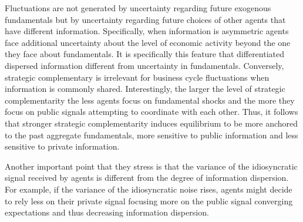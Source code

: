 \documentclass{article}
\begin{document}
{Fluctuations are not generated by uncertainty regarding future exogenous fundamentals but by uncertainty regarding future choices of other agents that have different information. Specifically, when information is asymmetric agents face additional uncertainty about the level of economic activity beyond the one they face about fundamentals. It is specifically this feature that differentiated dispersed information different from uncertainty in fundamentals. Conversely, strategic complementary is irrelevant for business cycle fluctuations when information is commonly shared. Interestingly, the larger the level of strategic complementarity the less agents focus on fundamental shocks and the more they focus on public signals attempting to coordinate with each other. Thus, it follows that stronger strategic complementarity induces equilibrium to be more anchored to the past aggregate fundamentals, more sensitive to public information and less sensitive to private information.

Another important point that they stress is that the variance of the idiosyncratic signal received by agents is different from the degree of information dispersion. For example, if the variance of the idiosyncratic noise rises, agents might decide to rely less on their private signal focusing more on the public signal converging expectations and thus decreasing information dispersion. 



}
\end{document}
